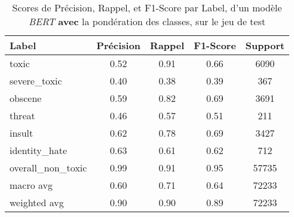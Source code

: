 \begin{table}[ht]
    \centering
    \caption{Scores de Précision, Rappel, et F1-Score par Label, d'un modèle \textit{BERT} \textbf{avec} la pondération des classes, sur le jeu de test}    \begin{tabular}{lcccc}
    \hline
    \textbf{Label} & \textbf{Précision} & \textbf{Rappel} & \textbf{F1-Score} & \textbf{Support} \\ \hline
    toxic          & 0.52               & 0.91            & 0.66              & 6090             \\
    severe\_toxic  & 0.40               & 0.38            & 0.39              & 367              \\
    obscene        & 0.59               & 0.82            & 0.69              & 3691             \\
    threat         & 0.46               & 0.57            & 0.51              & 211              \\
    insult         & 0.62               & 0.78            & 0.69              & 3427             \\
    identity\_hate & 0.63               & 0.61            & 0.62              & 712              \\
    overall\_non\_toxic & 0.99           & 0.91            & 0.95              & 57735            \\\hline
    macro avg      & 0.60              & 0.71            & 0.64              & 72233            \\
    weighted avg   & 0.90               & 0.90            & 0.89             & 72233            \\ \hline
    \end{tabular}
    \label{tab:scores}
\end{table}
